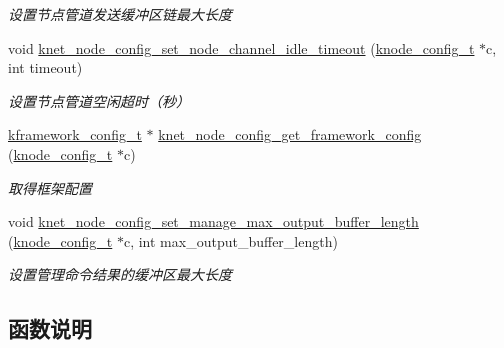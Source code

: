 \begin{DoxyCompactItemize}
\begin{DoxyCompactList}\small\item\em 设置节点管道发送缓冲区链最大长度 \end{DoxyCompactList}\item 
void \hyperlink{a00106_acd239745a361d6349e17c5fb34020d68_acd239745a361d6349e17c5fb34020d68}{knet\+\_\+node\+\_\+config\+\_\+set\+\_\+node\+\_\+channel\+\_\+idle\+\_\+timeout} (\hyperlink{a00066_af1cfaee0eb1c76ebf06076b95cc47ee1_af1cfaee0eb1c76ebf06076b95cc47ee1}{knode\+\_\+config\+\_\+t} $\ast$c, int timeout)
\begin{DoxyCompactList}\small\item\em 设置节点管道空闲超时（秒） \end{DoxyCompactList}\item 
\hyperlink{a00066_adeaf952e0f0887507ff836385bf54874_adeaf952e0f0887507ff836385bf54874}{kframework\+\_\+config\+\_\+t} $\ast$ \hyperlink{a00106_ac4092c01406b24279e7d5bc897967a50_ac4092c01406b24279e7d5bc897967a50}{knet\+\_\+node\+\_\+config\+\_\+get\+\_\+framework\+\_\+config} (\hyperlink{a00066_af1cfaee0eb1c76ebf06076b95cc47ee1_af1cfaee0eb1c76ebf06076b95cc47ee1}{knode\+\_\+config\+\_\+t} $\ast$c)
\begin{DoxyCompactList}\small\item\em 取得框架配置 \end{DoxyCompactList}\item 
void \hyperlink{a00106_a8cd19de125fcb7ed101d29ef3a2835fd_a8cd19de125fcb7ed101d29ef3a2835fd}{knet\+\_\+node\+\_\+config\+\_\+set\+\_\+manage\+\_\+max\+\_\+output\+\_\+buffer\+\_\+length} (\hyperlink{a00066_af1cfaee0eb1c76ebf06076b95cc47ee1_af1cfaee0eb1c76ebf06076b95cc47ee1}{knode\+\_\+config\+\_\+t} $\ast$c, int max\+\_\+output\+\_\+buffer\+\_\+length)
\begin{DoxyCompactList}\small\item\em 设置管理命令结果的缓冲区最大长度 \end{DoxyCompactList}\end{DoxyCompactItemize}


\subsection{函数说明}
\hypertarget{a00106_ae58212789e9236f88a4522a657699654_ae58212789e9236f88a4522a657699654}{}
